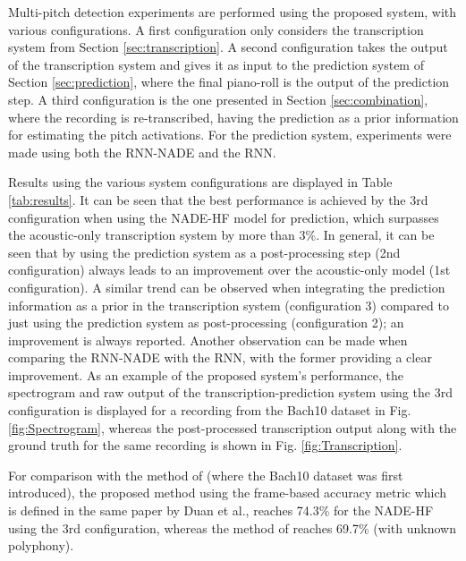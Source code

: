 Multi-pitch detection experiments are performed using the proposed system, with various configurations. A first configuration only considers the transcription system from Section \ref{sec:transcription}. A second configuration takes the output of the transcription system and gives it as input to the prediction system of Section \ref{sec:prediction}, where the final piano-roll is the output of the prediction step. A third configuration is the one presented in Section \ref{sec:combination}, where the recording is re-transcribed, having the prediction as a prior information for estimating the pitch activations. For the prediction system, experiments were made using both the RNN-NADE and the RNN.

Results using the various system configurations are displayed in Table \ref{tab:results}. It can be seen that the best performance is achieved by the 3rd configuration when using the NADE-HF model for prediction, which surpasses the acoustic-only transcription system by more than 3\%. In general, it can be seen that by using the prediction system as a post-processing step (2nd configuration) always leads to an improvement over the acoustic-only model (1st configuration). A similar trend can be observed when integrating the prediction information as a prior in the transcription system (configuration 3) compared to just using the prediction system as post-processing (configuration 2); an improvement is always reported. Another observation can be made when comparing the RNN-NADE with the RNN, with the former providing a clear improvement. As an example of the proposed system's performance, the spectrogram and raw output of the transcription-prediction system using the 3rd configuration is displayed for a recording from the Bach10 dataset in Fig. \ref{fig:Spectrogram}, whereas the post-processed transcription output along with the ground truth for the same recording is shown in Fig. \ref{fig:Transcription}.

For comparison with the method of \cite{Duan2010} (where the Bach10 dataset was first introduced), the proposed method using the frame-based accuracy metric which is defined in the same paper by Duan et al., reaches 74.3\% for the NADE-HF using the 3rd configuration, whereas the method of \cite{Duan2010} reaches 69.7\% (with unknown polyphony).

